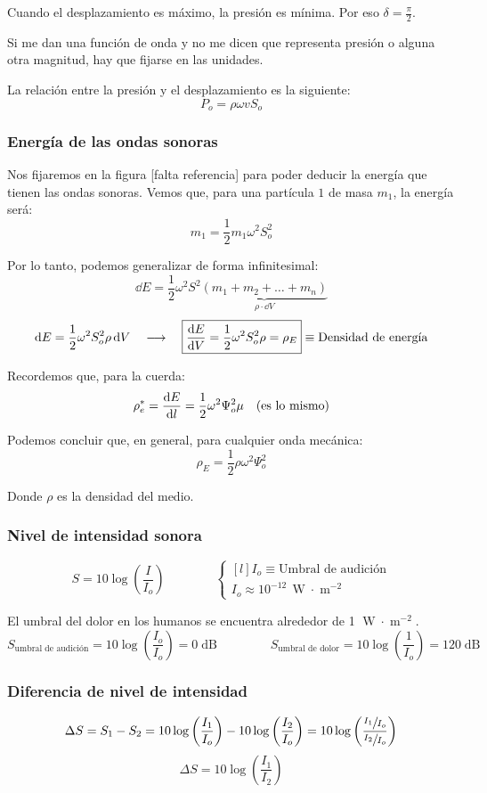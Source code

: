 \documentclass[a4paper]{book}
\numberwithin{figure}{chapter}
\numberwithin{equation}{chapter}
\newcommand{\subtext}[1]{_{\text{#1}}}
\newcommand{\db}{\operatorname{dB}}
\newcommand{\W}{\operatorname{W}}
\newcommand{\m}{\operatorname{m}}
\begin{document}
Cuando el desplazamiento es máximo, la presión es mínima. Por eso $\delta = \frac{\pi}{2}$.

Si me dan una función de onda y no me dicen que representa presión o alguna otra magnitud, hay que fijarse en las unidades.

La relación entre la presión y el desplazamiento es la siguiente:
\[P_o = \rho\omega v S_o\]

\subsubsection{Energía de las ondas sonoras}
Nos fijaremos en la figura [falta referencia] para poder deducir la energía que tienen las ondas sonoras. Vemos que, para una partícula $1$ de masa $m_1$, la energía será:
\[m_1 = \frac{1}{2}m_1\omega^2S_o^2\]

Por lo tanto, podemos generalizar de forma infinitesimal:
\[\dd{E} = \frac{1}{2}\omega^2S^2\underbrace{\left( m_1 + m_2 + \ldots + m_n \right)}_{\rho \cdot \dd{V}}\]
\[\dd{E} = \frac{1}{2}\omega^2 S_o^2\rho\dd{V}\quad \longrightarrow \quad \boxed{\dv{E}{V} = \frac{1}{2}\omega^2S_o^2\rho = \rho_E} \equiv \text{Densidad de energía}\]

Recordemos que, para la cuerda:
\[\rho_e^* = \dv{E}{l} = \frac{1}{2}\omega^2\Psi_o^2\mu \quad \text{(es lo mismo)}\]

Podemos concluir que, en general, para cualquier onda mecánica:
\[\boxed{\rho_E = \frac{1}{2}\rho\omega^2\Psi_o^2}\]

Donde $\rho$ es la densidad del medio.

\subsubsection{Nivel de intensidad sonora}
\[S = 10\log\left( \frac{I}{I_o} \right) \qquad \qquad \left\{ \begin{matrix*}[l]
		I_o \equiv \text{Umbral de audición}\\[5pt]
		I_o \approx 10^{-12}\, \W \cdot \m^{-2}
	\end{matrix*} \right. \]

El umbral del dolor en los humanos se encuentra alrededor de 1 $\W\cdot\m^{-2}$.
\[S\subtext{umbral de audición} = 10\log\left( \frac{I_o}{I_o} \right) = 0\db \qquad \qquad S\subtext{umbral de dolor} = 10\log\left( \frac{1}{I_o}\right)= 120\db\]

\subsubsection{Diferencia de nivel de intensidad}
\[\Delta S = S_1 - S_2 = 10 \log\left( \frac{I_1}{I_o} \right) - 10 \log\left( \frac{I_2}{I_o} \right) = 10 \log\left( \frac{\sfrac{I_1}{I_o}}{\sfrac{I_2}{I_o}} \right)\]
\[\boxed{\Delta S = 10 \log\left( \frac{I_1}{I_2} \right)}\]
\end{document}
